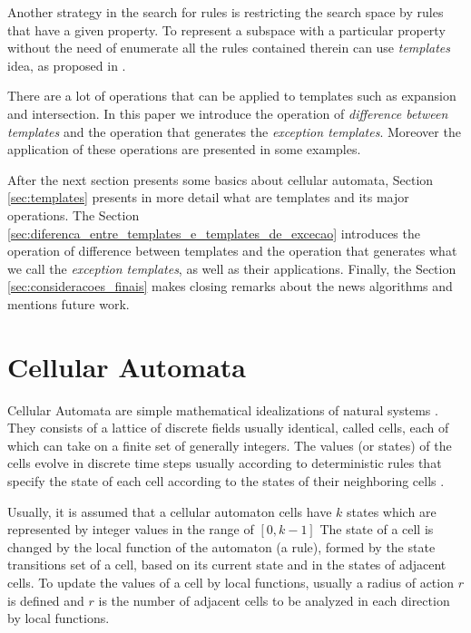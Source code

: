 \documentclass[12pt, a4paper]{article}
\begin{document}
Another strategy in the search for rules is restricting the search space by rules that have a given property. To represent a subspace with a particular property without the need of enumerate all the rules contained therein can use \textit{templates} idea, as proposed in \cite{deOliveira2014,deOliveira2014b}.

There are a lot of operations that can be applied to templates such as expansion and intersection. In this paper we introduce the operation of \textit{difference between templates} and the operation that generates the \textit{exception templates}. Moreover the application of these operations are presented in some examples.

After the next section presents some basics about cellular automata, Section \ref{sec:templates} presents in more detail what are templates and its major operations. The Section \ref{sec:diferenca_entre_templates_e_templates_de_excecao} introduces the operation of difference between templates and the operation that generates what we call the \textit{exception templates}, as well as their applications. Finally, the Section \ref{sec:consideracoes_finais} makes closing remarks about the news algorithms and mentions future work.

\section{Cellular Automata}
\label{sec:automatos_celulares}
Cellular Automata are simple mathematical idealizations of natural systems \cite{wolfram1994cellular}. They consists of a lattice of discrete fields usually identical, called cells, each of which can take on a finite set of generally integers. The values (or states) of the cells evolve in discrete time steps usually according to deterministic rules that specify the state of each cell according to the states of their neighboring cells \cite{wolfram1994cellular}.%

Usually, it is assumed that a cellular automaton cells have $k$ states which are represented by integer values in the range of $[0, k-1]$ The state of a cell is changed by the local function of the automaton (a rule), formed by the state transitions set of a cell, based on its current state and in the states of adjacent cells. To update the values of a cell by local functions, usually a radius of action $r$ is defined and $r$ is the number of adjacent cells to be analyzed in each direction by local functions.
\end{document}
